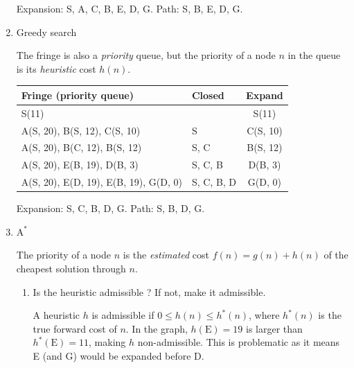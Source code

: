 \documentclass[11pt, a4paper]{article}
\def\Astar{$\text{A}^*$}
\begin{document}
\begin{enumerate}
\begin{solution}
        Expansion: S, A, C, B, E, D, G. Path: S, B, E, D, G.
    \end{solution}

    \item Greedy search

    \begin{solution}
        The fringe is also a \emph{priority} queue, but the priority of a node $n$ in the queue is its \emph{heuristic} cost $h(n)$.

        \begin{table}[h]
            \centering
            \begin{tabular}{l|l|c}
                \toprule
                Fringe (priority queue) & Closed & Expand \\
                \midrule
                S(11) & & S(11) \\
                A(S, 20), B(S, 12), C(S, 10) & S & C(S, 10) \\
                A(S, 20), B(C, 12), B(S, 12) & S, C & B(S, 12) \\
                A(S, 20), E(B, 19), D(B, 3) & S, C, B & D(B, 3) \\
                A(S, 20), E(D, 19), E(B, 19), G(D, 0) & S, C, B, D & G(D, 0) \\
                \bottomrule
            \end{tabular}
        \end{table}

        Expansion: S, C, B, D, G. Path: S, B, D, G.
    \end{solution}

    \item \Astar{}

    \begin{solution}
    The priority of a node $n$ is the \emph{estimated} cost $f(n) = g(n) + h(n)$ of the cheapest solution through $n$.
    \end{solution}

    \begin{enumerate}
        \item Is the heuristic admissible ? If not, make it admissible.

        \begin{solution}
            A heuristic $h$ is admissible if $0 \leq h(n) \leq h^*(n)$, where $h^*(n)$ is the true forward cost of $n$. In the graph, $h(\text{E}) = 19$ is larger than $h^*(\text{E}) = 11$, making $h$ non-admissible. This is problematic as it means E (and G) would be expanded before D.


\end{solution}
\end{enumerate}
\end{enumerate}
\end{document}

